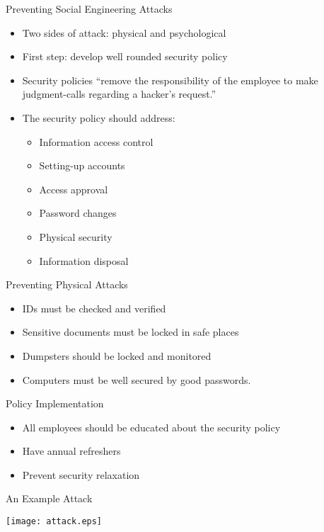 \documentclass[default,pdf,colorBG,slideColor]{prosper}
\begin{document}
\begin{slide}{Preventing Social Engineering Attacks}
\begin{itemize}
\item Two sides of attack: physical and psychological
\item First step: develop well rounded security policy
\item Security policies ``remove the responsibility of the employee to make judgment-calls regarding a hacker's request.''
\item The security policy should address:
\begin{itemize}
\item Information access control
\item Setting-up accounts
\item Access approval
\item Password changes
\item Physical security
\item Information disposal
\end{itemize}
\end{itemize}
\end{slide}

\begin{slide}{Preventing Physical Attacks}
\begin{itemize}
\item IDs must be checked and verified
\item Sensitive documents must be locked in safe places
\item Dumpsters should be locked and monitored
\item Computers must be well secured by good passwords.
\end{itemize}
\end{slide}

\begin{slide}{Policy Implementation}
\begin{itemize}
\item All employees should be educated about the security policy
\item Have annual refreshers
\item Prevent security relaxation
\end{itemize}
\end{slide}

\begin{slide}{An Example Attack}
\begin{center}
\texttt{[image: attack.eps]}
\end{center}
\end{slide}
\end{document}
